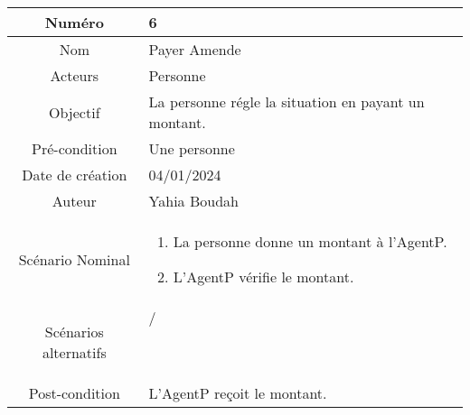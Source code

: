 

\begin{tabular}{ |c|p{12cm}| }
    \hline
    Numéro & 6 \\
    \hline
    Nom & Payer Amende \\
    \hline
    Acteurs & Personne \\ 
    \hline
    Objectif & La personne régle la situation en payant un montant. \\ 
    \hline
    Pré-condition & Une personne \\
    \hline
    Date de création & 04/01/2024 \\
    \hline
    Auteur & Yahia Boudah \\
    \hline
    Scénario Nominal & \begin{enumerate}
        \item La personne donne un montant à l'AgentP.
        \item L'AgentP vérifie le montant.
    \end{enumerate} \\
    \hline
    Scénarios alternatifs & \begin{description}
        \item[/]
    \end{description} \\
    \hline
    Post-condition & L'AgentP reçoit le montant. \\
    \hline
\end{tabular}